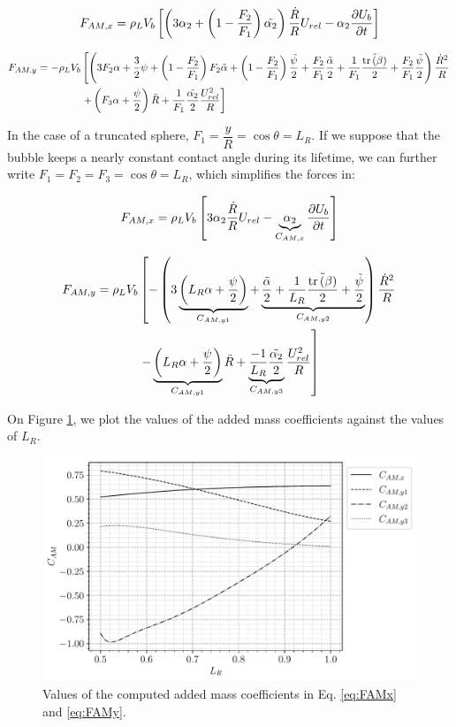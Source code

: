 \begin{align}
F_{AM,x} = \rho_{L}V_{b} \left[  \left(  3\alpha_{2} +\left( 1-\frac{F_{2}}{F_{1}} \right)\tilde{\alpha_{2}}  \right) \frac{\dot{R}}{R}U_{rel} - \alpha_{2} \frac{\partial{U_{b}}}{\partial t}  \right]
\end{align}

\begin{align}
\nonumber F_{AM,y} = - \rho_{L} V_{b} & \left[ \left(  3 F_{2}\alpha + \frac{3}{2}\psi + \left( 1- \frac{F_{2}}{F_{1}} \right)F_{2} \tilde{\alpha} + \left( 1- \frac{F_{2}}{F_{1}} \right)\frac{\tilde{\psi}}{2}  + \frac{F_{2}}{F_{1}}\frac{\tilde{\alpha}}{2} + \frac{1}{F_{1}} \frac{\tilde{\mathrm{tr}\left( \beta \right)}}{2} + \frac{F_{2}}{F_{1}} \frac{\tilde{\psi}}{2} \right)\frac{\dot{R}^{2}}{R} \right.\\
& \left.  + \left( F_{3}\alpha + \frac{\psi}{2} \right)\ddot{R} + \frac{1}{F_{1}}\frac{\tilde{\alpha_{2}}}{2} \frac{U_{rel}^{2}}{R}  \right] 
\end{align}


In the case of a truncated sphere, $F_{1} = \dfrac{y}{R} = \cos{\theta}=L_{R}$. If we suppose that the bubble keeps a nearly constant contact angle during its lifetime, we can further write $F_{1}=F_{2}=F_{3}=\cos{\theta}=L_{R}$, which simplifies the forces in:


\begin{align}
F_{AM,x} = \rho_{L}V_{b} \left[  3\alpha_{2} \frac{\dot{R}}{R}U_{rel} - \underbrace{\alpha_{2}}_{C_{AM,x}} \frac{\partial{U_{b}}}{\partial t}  \right]
\label{eq:FAMx}
\end{align}


\begin{align}
F_{AM,y} = \rho_{L} V_{b} & \left[  -\parth{ 3 \underbrace{\parth{L_{R}\alpha + \frac{\psi}{2} } }_{C_{AM,y1}} + \underbrace {\frac{\tilde{\alpha}}{2} + \frac{1}{L_{R}} \frac{\tilde{\trb}}{2} + \frac{\tilde{\psi}}{2}}_{C_{AM,y2}} } \frac{\dot{R}^{2}}{R} \right. \\
%
& \left. - \underbrace{ \parth{L_{R}\alpha + \frac{\psi}{2}} }_{C_{AM,y1}} \ddot{R} + \underbrace{ \frac{-1}{L_{R}}\frac{\tilde{\alpha_{2}}}{2} }_{C_{AM,y3}} \frac{U_{rel}^{2}}{R}  \right] 
\label{eq:FAMy}
\end{align}


On Figure \ref{fig:AM_coeff}, we plot the values of the added mass coefficients against the values of $L_{R}$. 

\begin{figure}[h!]
\centering
\includegraphics[width=0.65\linewidth]{img/bub_dyn/forces/CAM_plot.pdf}
\caption{Values of the computed added mass coefficients in Eq. \ref{eq:FAMx} and \ref{eq:FAMy}. }
\label{fig:AM_coeff}
\end{figure}

